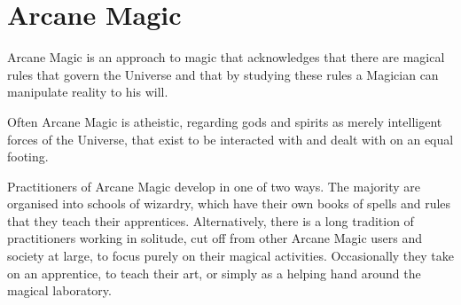 \chapter{Arcane Magic}
\label{ch:arcane}

Arcane Magic is an approach to magic that acknowledges that there are magical rules that govern the Universe and that by studying these rules a Magician can manipulate reality to his will.

Often Arcane Magic is atheistic, regarding gods and spirits as merely intelligent forces of the Universe, that exist to be interacted with and dealt with on an equal footing. 

Practitioners of Arcane Magic develop in one of two ways. The majority are organised into schools of wizardry, which have their own books of spells and rules that they teach their apprentices. Alternatively, there is a long tradition of practitioners working in solitude, cut off from other Arcane Magic users and society at large, to focus purely on their magical activities. Occasionally they take on an apprentice, to teach their art, or simply as a helping hand around the magical laboratory.

